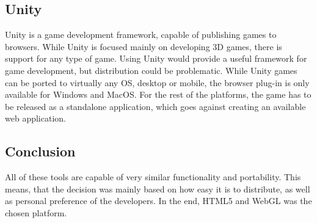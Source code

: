 \subsection{Unity}
Unity is a game development framework, capable of publishing games to browsers.\cite{unity13} 
While Unity is focused mainly on developing 3D games, there is support for any type of game.
Using Unity would provide a useful framework for game development, but distribution could be problematic.
While Unity games can be ported to virtually any OS, desktop or mobile, the browser plug-in is only available for Windows and MacOS.
For the rest of the platforms, the game has to be released as a standalone application, which goes against creating an available web application.

\subsection{Conclusion}
All of these tools are capable of very similar functionality and portability. This means, that the decision was mainly based on how easy it is to distribute, as well as personal preference of the developers.
In the end, HTML5 and WebGL was the chosen platform.